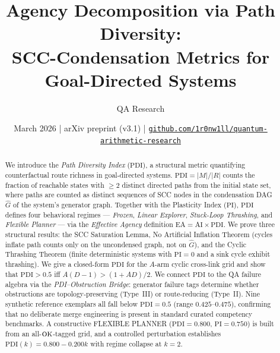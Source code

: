 \documentclass[11pt,letterpaper]{article}
\theoremstyle{plain}
\theoremstyle{definition}
\theoremstyle{remark}
\newcommand{\PDI}{\mathrm{PDI}}
\newcommand{\AI}{\mathrm{AI}}
\newcommand{\PI}{\mathrm{PI}}
\newcommand{\EA}{\mathrm{EA}}
\newcommand{\OK}{\textup{\textsc{ok}}}
\newcommand{\Ghat}{\hat{G}}
\begin{document}
\title{\textbf{Agency Decomposition via Path Diversity:}\\
       SCC-Condensation Metrics for Goal-Directed Systems}

\author{QA Research}
\date{March 2026 \quad|\quad
      arXiv preprint (v3.1) \quad|\quad
      \href{https://github.com/1r0nw1ll/quantum-arithmetic-research}{%
        \texttt{github.com/1r0nw1ll/quantum-arithmetic-research}}}

\maketitle

\begin{abstract}
We introduce the \emph{Path Diversity Index} ($\PDI$), a structural metric
quantifying counterfactual route richness in goal-directed systems.
$\PDI = |M|/|R|$ counts the fraction of reachable states with $\geq 2$
distinct directed paths from the initial state set, where paths are counted
as distinct sequences of SCC nodes in the condensation DAG $\Ghat$ of the
system's generator graph.
Together with the Plasticity Index ($\PI$), $\PDI$ defines four behavioral
regimes --- \emph{Frozen}, \emph{Linear Explorer},
\emph{Stuck-Loop Thrashing}, and \emph{Flexible Planner} ---
via the \emph{Effective Agency} definition $\EA = \AI \times \PDI$.
We prove three structural results: the SCC Saturation Lemma,
No Artificial Inflation Theorem (cycles inflate path counts only
on the uncondensed graph, not on $\Ghat$), and the Cyclic
Thrashing Theorem (finite deterministic systems with $\PI = 0$
and a sink cycle exhibit thrashing).
We give a closed-form $\PDI$ for the $A$-arm cyclic cross-link grid
and show that $\PDI > 0.5$ iff $A(D-1) > (1+AD)/2$.
We connect $\PDI$ to the QA failure algebra via the
\emph{PDI--Obstruction Bridge}: generator failure tags
determine whether obstructions are topology-preserving (Type~III)
or route-reducing (Type~II).
Nine synthetic reference exemplars all fall below $\PDI = 0.5$
(range $0.425$--$0.475$), confirming that no deliberate merge engineering
is present in standard curated competency benchmarks.
A constructive FLEXIBLE PLANNER ($\PDI = 0.800$, $\PI = 0.750$) is built
from an all-$\OK$-tagged grid, and a controlled perturbation establishes
$\PDI(k) = 0.800 - 0.200k$ with regime collapse at $k=2$.
\end{abstract}

\end{document}
